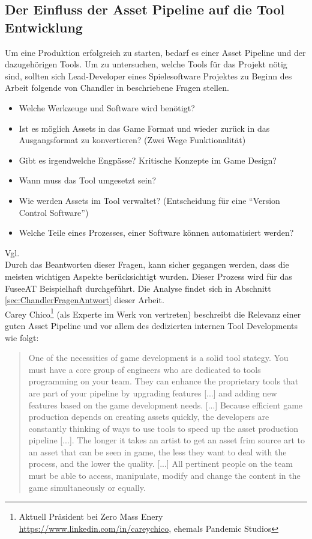\documentclass[pagesize, paper=a4, fontsize=12pt, titlepage=true, headings=small, headnosepline, abstractoff, liststotoc, nochapterprefix, plainheadsepline, twoside]{scrreprt}
\begin{document}
\subsection {Der Einfluss der Asset Pipeline auf die Tool Entwicklung}\label{sec:ChandlerFragenKatalog}
Um eine Produktion erfolgreich zu starten, bedarf es einer Asset Pipeline und der dazugehörigen Tools. Um zu untersuchen, welche Tools für das Projekt nötig sind, sollten sich Lead-Developer eines Spielesoftware Projektes zu Beginn des Arbeit folgende von Chandler in \parencite[S 223-224]{Chandler2006} beschriebene Fragen stellen.
\begin{itemize}
\item Welche Werkzeuge und Software wird benötigt?
\item Ist es möglich Assets in das Game Format und wieder zurück in das Ausgangsformat zu konvertieren? (Zwei Wege Funktionalität)
\item Gibt es irgendwelche Engpässe? Kritische Konzepte im Game Design?
\item Wann muss das Tool umgesetzt sein?
\item Wie werden Assets im Tool verwaltet? (Entscheidung für eine “Version Control Software”)
\item Welche Teile eines Prozesses, einer Software können automatisiert werden?
\end{itemize} Vgl. \autocite[S. 224-225]{Chandler2006}
\\
Durch das Beantworten dieser Fragen, kann sicher gegangen werden, dass die meisten wichtigen Aspekte berücksichtigt wurden. Dieser Prozess wird für das FuseeAT Beispielhaft durchgeführt. Die Analyse findet sich in Abschnitt \ref{sec:ChandlerFragenAntwort} dieser Arbeit.
\\
Carey Chico\footnote{Aktuell Präsident bei Zero Mass Enery \url{https://www.linkedin.com/in/careychico}, ehemals Pandemic Studios} (als Experte im Werk von \cite{Chandler2006} vertreten) beschreibt die Relevanz einer guten Asset Pipeline und vor allem des dedizierten internen Tool Developments wie folgt:
\begin{quote}
One of the necessities of game development is a solid tool stategy. You must have a core group of engineers who are dedicated to tools programming on your team. They can enhance the proprietary tools that are part of your pipeline by upgrading features [...] and adding new features based on the game development needs. [...] Because efficient game production depends on creating assets quickly, the developers are constantly thinking of ways to use tools to speed up the asset production pipeline [...]. The longer it takes an artist to get an asset frim source art to an asset that can be seen in game, the less they want to deal with the process, and the lower the quality.
[...]
All pertinent people on the team must be able to access, manipulate, modify and change the content in the game simultaneously or equally.
\autocite[S. 224-225]{Chandler2006}
\end{quote}
\end{document}
